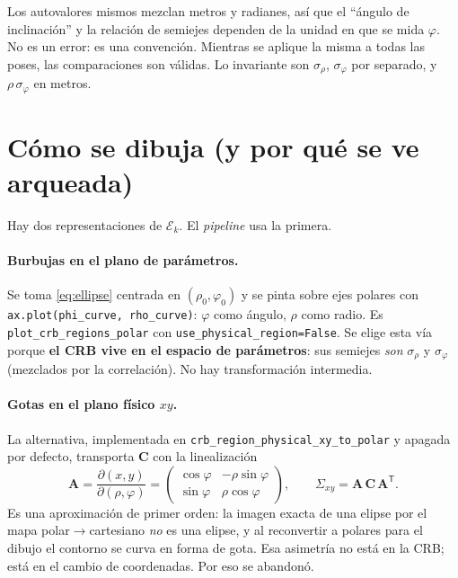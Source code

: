 \documentclass[11pt,a4paper]{article}
\newcommand{\matr}[1]{\mathbf{#1}}
\newcommand{\code}[1]{\texttt{#1}}
\theoremstyle{definition}
\theoremstyle{plain}
\begin{document}
Los autovalores mismos mezclan metros y radianes, as\'i que el \enquote{\'angulo
de inclinaci\'on} y la relaci\'on de semiejes dependen de la unidad en que se
mida $\varphi$. No es un error: es una convenci\'on. Mientras se aplique la
misma a todas las poses, las comparaciones son v\'alidas. Lo invariante son
$\sigma_\rho$, $\sigma_\varphi$ por separado, y $\rho\,\sigma_\varphi$ en
metros.

\section{C\'omo se dibuja (y por qu\'e se ve arqueada)}
\label{sec:dibujo}

Hay dos representaciones de $\mathcal E_k$. El \emph{pipeline} usa la primera.

\paragraph{Burbujas en el plano de par\'ametros.}
Se toma \eqref{eq:ellipse} centrada en $(\rho_0,\varphi_0)$ y se pinta sobre
ejes polares con \code{ax.plot(phi\_curve, rho\_curve)}: $\varphi$ como
\'angulo, $\rho$ como radio. Es
\code{plot\_crb\_regions\_polar} con
\code{use\_physical\_region=False}. Se elige esta v\'ia porque \textbf{el CRB vive
en el espacio de par\'ametros}: sus semiejes \emph{son} $\sigma_\rho$ y
$\sigma_\varphi$ (mezclados por la correlaci\'on). No hay transformaci\'on
intermedia.

\paragraph{Gotas en el plano f\'isico $xy$.}
La alternativa, implementada en \code{crb\_region\_physical\_xy\_to\_polar}
y apagada por defecto, transporta $\matr C$ con la linealizaci\'on
%
\begin{equation}
\label{eq:push}
\matr A
= \frac{\partial(x,y)}{\partial(\rho,\varphi)}
= \begin{pmatrix}
    \cos\varphi & -\rho\sin\varphi \\
    \sin\varphi & \rho\cos\varphi
  \end{pmatrix},
\qquad
\Sigma_{xy}=\matr A\,\matr C\,\matr A^{\mathsf T}.
\end{equation}
%
Es una aproximaci\'on de primer orden: la imagen exacta de una elipse por el
mapa polar$\to$cartesiano \emph{no} es una elipse, y al reconvertir a polares
para el dibujo el contorno se curva en forma de gota. Esa asimetr\'ia no est\'a
en la CRB; est\'a en el cambio de coordenadas. Por eso se abandon\'o.
\end{document}
